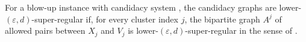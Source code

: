 \begin{definition}
For a blow-up instance with candidacy system , the candidacy graphs are lower-$(\varepsilon,d)$-super-regular if, for every cluster index $j$, the bipartite graph $A^j$ of allowed pairs between $X_j$ and $V_j$ is lower-$(\varepsilon,d)$-super-regular in the sense of .
\end{definition}

